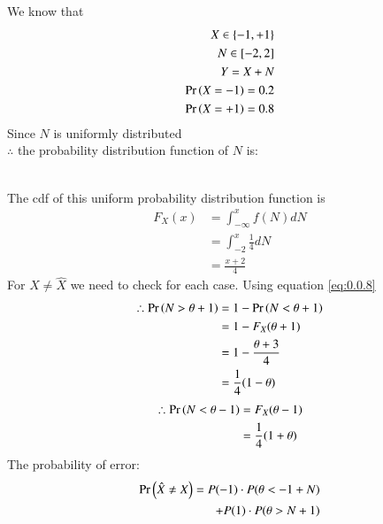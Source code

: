 
We know that 
\begin{align}
    X \in \{-1,+1\}\\
    N \in [-2,2]\\
    Y = X + N\\
    \Pr\left(X = -1\right) = 0.2\\
    \Pr\left(X = +1\right) = 0.8
\end{align}
Since $N$ is uniformly distributed\\
$\therefore$ the probability distribution function of $N$ is:

\\
The cdf of this uniform probability distribution function is
\begin{align}
    F_X(x) &= \int_{-\infty}^xf(N)dN \\ 
    &=\int_{-2}^x\frac{1}{4}dN\\
    &=\frac{x+2}{4}\label{eq:0.0.8}
\end{align}
For $X \neq \hat{X}$ we need to check for each case. Using equation \eqref{eq:0.0.8}
\begin{align}
\therefore
    \pr{N>\theta + 1} &= 1-\pr{N < \theta + 1}\\
    &= 1-F_X(\theta + 1)\\
    &= 1- \frac{\theta + 3}{4}\\
    &= \frac{1}{4}(1-\theta)\label{eq:0.0.12}
\end{align}
\begin{align}
\therefore
    \pr{N < \theta-1} &= F_X(\theta - 1)\\
    &= \frac{1}{4}(1+\theta)\label{eq:0.0.14}
\end{align}
The probability of error:
\begin{align}
\nonumber
    \pr {\hat{X} \neq X} = P(-1)\cdot {P(\theta < -1 + N)} \\ 
            \quad+ P(1)\cdot {P(\theta> N + 1)}\label{eq:0.0.15}
\end{align}

